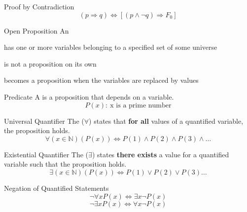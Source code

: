 \documentclass[12pt]{report}
\begin{document}
\begin{genbox}{Proof by Contradiction}
	$$(p \Rightarrow q) \iff \left[ (p \land \neg q) \Rightarrow F_0 \right]$$
\end{genbox}

\begin{dfnbox}{Open Proposition}
	An 
	\begin{dfnitems}
		\item has one or more variables belonging to a specified set of some universe
		\item is not a proposition on its own
		\item becomes a proposition when the variables are replaced by values
	\end{dfnitems}
\end{dfnbox}

\begin{dfnbox}{Predicate}
	A  is a proposition that depends on a variable.
	$$P(x):\ \text{x is a prime number}$$
\end{dfnbox}

\begin{dfnbox}{Universal Quantifier}
	The  ($\forall$) states that \textbf{for all} values of a quantified variable, the proposition holds.
	$$\forall (x \in \mathbb{N}) (P(x)) \iff P(1) \land P(2) \land P(3) \land \ldots$$
\end{dfnbox}

\begin{dfnbox}{Existential Quantifier}
	The  ($\exists$) states \textbf{there exists} a value for a quantified variable such that the proposition holds.
	$$\exists (x \in \mathbb{N})(P(x)) \iff P(1) \lor P(2) \lor P(3) \ldots$$
\end{dfnbox}

\begin{genbox}{Negation of Quantified Statements}
	$$\neg \forall x P(x) \iff \exists x \neg P(x)$$
	$$\neg \exists x P(x) \iff \forall x \neg P(x)$$
\end{genbox}
\end{document}

